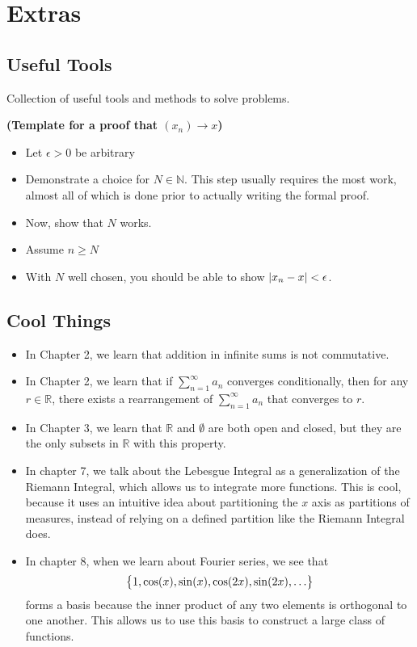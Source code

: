 \appendix
\chapter{Extras}
\section{Useful Tools}

Collection of useful tools and methods to solve problems.

\begin{tip}
  \textbf{
    (Template for a proof that $(x_n) \rightarrow x$)
  }
  \begin{itemize}
    \item Let $\epsilon > 0$ be arbitrary 
    \item Demonstrate a choice for $N \in \mathbb{N}$. 
    This step usually requires the most work, almost all of
    which is done prior to actually writing the formal proof.
    \item Now, show that $N$ works.
    \item Assume $n \geq N$
    \item With $N$ well chosen,  you should be able to show $\abs{x_n - x} < \epsilon$.
  \end{itemize}
\end{tip}

\section{Cool Things}
\begin{itemize}
  \item In Chapter 2, we learn that addition in infinite sums is not commutative.
  \item In Chapter 2, we learn that if $\sum_{n=1}^\infty a_n$ converges conditionally, then 
  for any $r \in \mathbb{R}$, there exists a rearrangement of $\sum_{n=1}^\infty a_n$ that converges to $r$.
  \item In Chapter 3, we learn that $\mathbb{R}$ and $\emptyset$ are both open and closed, 
  but they are the only subsets in $\mathbb{R}$ with this property.
  \item In chapter 7, we talk about the Lebesgue Integral as a generalization of the Riemann Integral,
  which allows us to integrate more functions. This is cool, because it uses an intuitive
  idea about partitioning the $x$ axis as partitions of measures, instead of relying on 
  a defined partition like the Riemann Integral does.
  \item In chapter 8, when we learn about Fourier series,
  we see that 
  \begin{equation}
    \pbrac{
      1, \cos(x), \sin(x), \cos(2x), \sin(2x), \dots
    }
  \end{equation}
  forms a basis because the inner product of any two elements is orthogonal
  to one another. This allows us to use this basis to construct a large class
  of functions.
\end{itemize}

